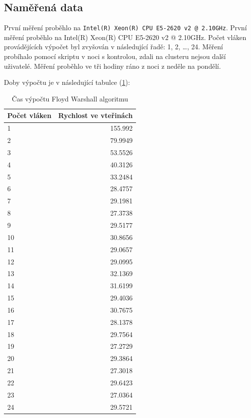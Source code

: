 \documentclass[a4paper,10pt]{article}
\begin{document}
\subsection{Naměřená data}

První měření proběhlo na \texttt{Intel(R) Xeon(R) CPU E5-2620 v2 @ 2.10GHz}. První měření proběhlo na Intel(R) Xeon(R) CPU E5-2620 v2 @ 2.10GHz. Počet vláken provádějících výpočet byl zvyšován v následující řadě: 1, 2, \dots , 24. Měření probíhalo pomocí skriptu v noci s kontrolou, zdali na clusteru nejsou další uživatelé. Měření proběhlo ve tři hodiny ráno z noci z neděle na pondělí.

Doby výpočtu je v následující tabulce (\ref{tab:xnfl}):

\begin{table}[H]
  \centering
	\caption{Čas výpočtu Floyd Warshall algoritmu}
	\begin{tabular}{| l | r |}
\hline
Počet vláken & Rychlost ve vteřinách \\ \hline
1 & 155.992 \\ \hline
2 & 79.9949 \\ \hline
3 & 53.5526 \\ \hline
4 & 40.3126 \\ \hline
5 & 33.2484 \\ \hline
6 & 28.4757 \\ \hline
7 & 29.1981 \\ \hline
8 & 27.3738 \\ \hline
9 & 29.5177 \\ \hline
10 & 30.8656 \\ \hline
11 & 29.0657 \\ \hline
12 & 29.0995 \\ \hline
13 & 32.1369 \\ \hline
14 & 31.6199 \\ \hline
15 & 29.4036 \\ \hline
16 & 30.7675 \\ \hline
17 & 28.1378 \\ \hline
18 & 29.7564 \\ \hline
19 & 27.2729 \\ \hline
20 & 29.3864 \\ \hline
21 & 27.3018 \\ \hline
22 & 29.6423 \\ \hline
23 & 27.0364 \\ \hline
24 & 29.5721 \\ \hline
	\end{tabular}
  \label{tab:xnfl}
\end{table}
\end{document}
